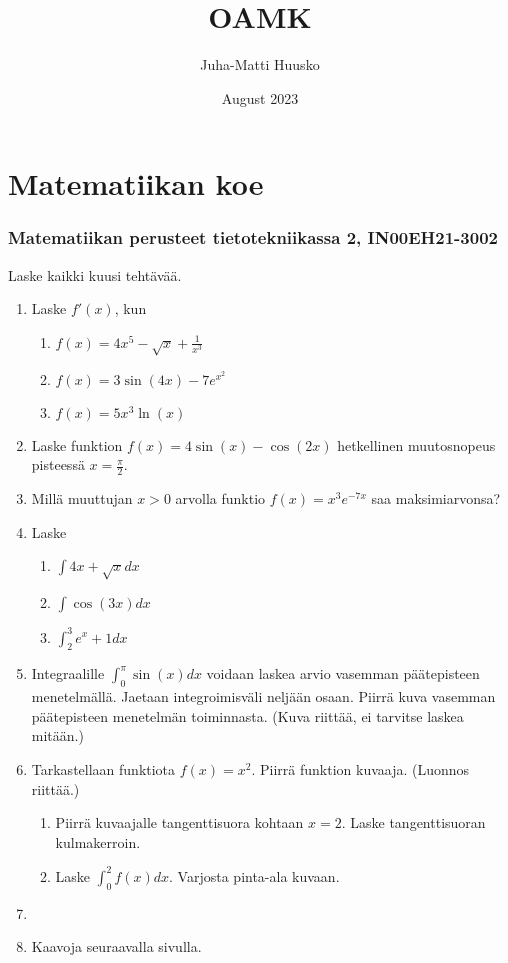 \documentclass[12pt]{article}
\title{OAMK}
\author{Juha-Matti Huusko}
\date{August 2023}
\begin{document}
\thispagestyle{empty}

\section*{Matematiikan koe}
\subsubsection*{Matematiikan perusteet tietotekniikassa 2, IN00EH21-3002}

Laske kaikki kuusi tehtävää.

\begin{enumerate}
\item Laske $f'(x)$, kun
\begin{enumerate}
\item $f(x)=4x^5-\sqrt{x}+\frac{1}{x^3}$
\item $f(x)=3\sin(4x)-7e^{x^2}$
\item $f(x)=5x^3\ln(x)$
\end{enumerate}
\item Laske funktion $f(x)=4\sin(x)-\cos(2x)$ hetkellinen muutosnopeus pisteessä $x=\frac{\pi}{2}$.
\item Millä muuttujan \(x>0\) arvolla funktio \(f(x)=x^3e^{-7x}\) saa maksimiarvonsa?
\item Laske
\begin{enumerate}
\item $\int 4x+\sqrt{x}dx$
\item $\int \cos(3x)dx$
\item $\int_2^3 e^{x}+1dx$
\end{enumerate}

\item Integraalille $\int_0^\pi \sin(x)dx$ voidaan laskea arvio vasemman päätepisteen menetelmällä. Jaetaan integroimisväli neljään osaan. Piirrä kuva vasemman päätepisteen menetelmän toiminnasta. (Kuva riittää, ei tarvitse laskea mitään.)

\item Tarkastellaan funktiota $f(x)=x^2$. Piirrä funktion kuvaaja. (Luonnos riittää.)
\begin{enumerate}
\item Piirrä kuvaajalle tangenttisuora kohtaan $x=2$. Laske tangenttisuoran kulmakerroin.
\item Laske $\int_0^2 f(x)dx$. Varjosta pinta-ala kuvaan.
\end{enumerate}
\item []
\item [] Kaavoja seuraavalla sivulla.
\end{enumerate}
\end{document}
